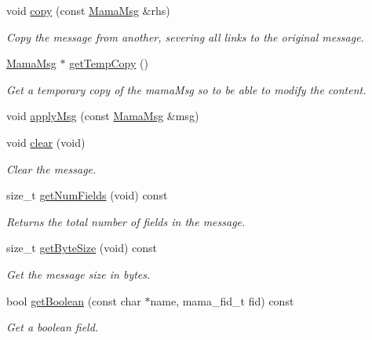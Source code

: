 \begin{DoxyCompactItemize}
void \hyperlink{classWombat_1_1MamaMsg_acbdde7468cb179ff79958b06ba51cdba}{copy} (const \hyperlink{classWombat_1_1MamaMsg}{MamaMsg} \&rhs)
\begin{DoxyCompactList}\small\item\em Copy the message from another, severing all links to the original message. \item\end{DoxyCompactList}\item 
\hyperlink{classWombat_1_1MamaMsg}{MamaMsg} $\ast$ \hyperlink{classWombat_1_1MamaMsg_a7d02fb51be62ecefa65bf81eef0cc1b6}{getTempCopy} ()
\begin{DoxyCompactList}\small\item\em Get a temporary copy of the mamaMsg so to be able to modify the content. \item\end{DoxyCompactList}\item 
void \hyperlink{classWombat_1_1MamaMsg_ab2d67b34c26777a8d1442889834996b6}{applyMsg} (const \hyperlink{classWombat_1_1MamaMsg}{MamaMsg} \&msg)
\item 
void \hyperlink{classWombat_1_1MamaMsg_a25d3af98bfa9ad89d93d6534a2c0ae2d}{clear} (void)
\begin{DoxyCompactList}\small\item\em Clear the message. \item\end{DoxyCompactList}\item 
size\_\-t \hyperlink{classWombat_1_1MamaMsg_a51d42ee46ebdc5d6acaec8b88461985f}{getNumFields} (void) const 
\begin{DoxyCompactList}\small\item\em Returns the total number of fields in the message. \item\end{DoxyCompactList}\item 
size\_\-t \hyperlink{classWombat_1_1MamaMsg_ad6484dcc3225bedd025142b9f8c821c0}{getByteSize} (void) const 
\begin{DoxyCompactList}\small\item\em Get the message size in bytes. \item\end{DoxyCompactList}\item 
bool \hyperlink{classWombat_1_1MamaMsg_a112955bcd29cbcf8af160d3f8cda018d}{getBoolean} (const char $\ast$name, mama\_\-fid\_\-t fid) const 
\begin{DoxyCompactList}\small\item\em Get a boolean field. \item\end{DoxyCompactList}\item 

\end{DoxyCompactItemize}
